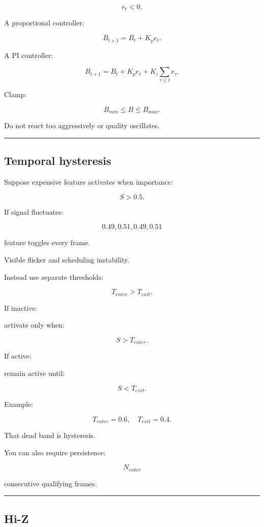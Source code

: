 \[
e_t<0.
\]

A proportional controller:

\[
B_{t+1}
=
B_t
+
K_p e_t.
\]

A PI controller:

\[
\boxed{
B_{t+1}
=
B_t
+
K_p e_t
+
K_i\sum_{\tau\le t}e_\tau.
}
\]

Clamp:

\[
B_{min}\le B\le B_{max}.
\]

Do not react too aggressively or quality oscillates.

\begin{center}\rule{0.5\linewidth}{0.5pt}\end{center}

\subsection{Temporal hysteresis}\label{04-visual-computing-ii-ch040-temporal-hysteresis}

Suppose expensive feature activates when importance:

\[
S>0.5.
\]

If signal fluctuates:

\[
0.49,0.51,0.49,0.51
\]

feature toggles every frame.

Visible flicker and scheduling instability.

Instead use separate thresholds:

\[
\boxed{
T_{enter}>T_{exit}.
}
\]

If inactive:

activate only when:

\[
S>T_{enter}.
\]

If active:

remain active until:

\[
S<T_{exit}.
\]

Example:

\[
T_{enter}=0.6,
\quad
T_{exit}=0.4.
\]

That dead band is hysteresis.

You can also require persistence:

\[
N_{enter}
\]

consecutive qualifying frames.

\begin{center}\rule{0.5\linewidth}{0.5pt}\end{center}

\subsection{Hi-Z}\label{04-visual-computing-ii-ch040-hi-z}


